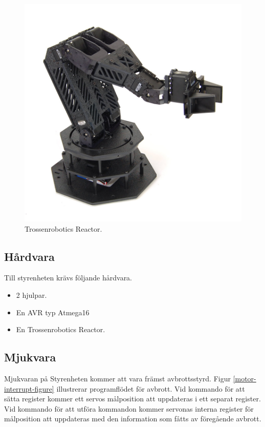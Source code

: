 \begin{figure}[h]
\center
\includegraphics[scale=0.35]{arm}
\caption{Trossenrobotics Reactor.}
\end{figure}

\subsection{Hårdvara}

Till styrenheten krävs följande hårdvara.
\begin{itemize}
\item{2 hjulpar.}
\item{En AVR typ Atmega16}
\item{En Trossenrobotics Reactor.}
\end{itemize}

\subsection{Mjukvara}

Mjukvaran på Styrenheten kommer att vara främst avbrottsstyrd. Figur \ref{motor-interrupt-figure} illustrerar programflödet för avbrott. Vid kommando för att sätta register kommer ett servos målposition att uppdateras i ett separat register. Vid kommando för att utföra kommandon kommer servonas interna register för målposition att uppdateras med den information som fåtts av föregående avbrott. \\


